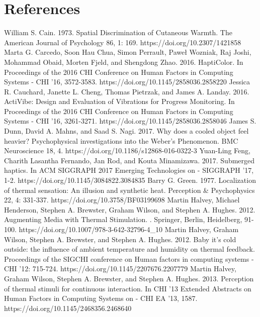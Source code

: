\documentclass[preprint,12pt]{elsarticle}
\begin{document}
\section*{References}
\begin{thebibliography}{00}


William S. Cain. 1973. Spatial Discrimination of Cutaneous Warmth. The American Journal of Psychology 86, 1: 169. https://doi.org/10.2307/1421858
Marta G. Carcedo, Soon Hau Chua, Simon Perrault, Paweł Wozniak, Raj Joshi, Mohammad Obaid, Morten Fjeld, and Shengdong Zhao. 2016. HaptiColor. In Proceedings of the 2016 CHI Conference on Human Factors in Computing Systems - CHI '16, 3572-3583. https://doi.org/10.1145/2858036.2858220
Jessica R. Cauchard, Janette L. Cheng, Thomas Pietrzak, and James A. Landay. 2016. ActiVibe: Design and Evaluation of Vibrations for Progress Monitoring. In Proceedings of the 2016 CHI Conference on Human Factors in Computing Systems - CHI '16, 3261-3271. https://doi.org/10.1145/2858036.2858046
James S. Dunn, David A. Mahns, and Saad S. Nagi. 2017. Why does a cooled object feel heavier? Psychophysical investigations into the Weber's Phenomenon. BMC Neuroscience 18, 4. https://doi.org/10.1186/s12868-016-0322-3
Yuan-Ling Feng, Charith Lasantha Fernando, Jan Rod, and Kouta Minamizawa. 2017. Submerged haptics. In ACM SIGGRAPH 2017 Emerging Technologies on - SIGGRAPH '17, 1-2. https://doi.org/10.1145/3084822.3084835
Barry G. Green. 1977. Localization of thermal sensation: An illusion and synthetic heat. Perception \& Psychophysics 22, 4: 331-337. https://doi.org/10.3758/BF03199698
Martin Halvey, Michael Henderson, Stephen A. Brewster, Graham Wilson, and Stephen A. Hughes. 2012. Augmenting Media with Thermal Stimulation. . Springer, Berlin, Heidelberg, 91-100. https://doi.org/10.1007/978-3-642-32796-4\_10
Martin Halvey, Graham Wilson, Stephen A. Brewster, and Stephen A. Hughes. 2012. Baby it's cold outside: the influence of ambient temperature and humidity on thermal feedback. Proceedings of the SIGCHI conference on Human factors in computing systems - CHI '12: 715-724. https://doi.org/10.1145/2207676.2207779
Martin Halvey, Graham Wilson, Stephen A. Brewster, and Stephen A. Hughes. 2013. Perception of thermal stimuli for continuous interaction. In CHI '13 Extended Abstracts on Human Factors in Computing Systems on - CHI EA '13, 1587. https://doi.org/10.1145/2468356.2468640

\end{thebibliography}
\end{document}

